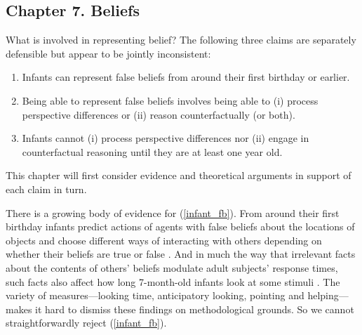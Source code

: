 \documentclass[12pt,\papersize]{extarticle}
\begin{document}
%
%
%


\subsection{Chapter 7. Beliefs}
What is involved in representing belief?
The following three claims are separately defensible but appear to be jointly inconsistent: 
%
\begin{enumerate}
\item Infants can represent false beliefs from around their first birthday or earlier. \label{infant_fb}
%
\item  \label{fb_is_perspectives}  Being able to represent false beliefs involves being able to  (i) process perspective differences or (ii) reason counterfactually (or both).
%
\item Infants cannot (i) process perspective differences nor (ii) engage in counterfactual reasoning until they are at least one year old.  \label{infant_perspectives}
%
\end{enumerate}
%
This chapter will first consider evidence and theoretical arguments in support of each claim in turn.  

There is a growing body of evidence for (\ref{infant_fb}).
From around their first birthday infants  predict actions of agents with false beliefs about the locations of objects \citep[]{Onishi:2005hm, Southgate:2007js}
and choose different ways of interacting with others depending on whether their beliefs are true or false \citep[]{Buttelmann:2009gy,Knudsen:2011fk,southgate:2010fb}.  
And in much the way that irrelevant facts about the contents of others’ beliefs modulate adult subjects’ response times, such facts also affect how long 7-month-old infants look at some stimuli \citep[]{kovacs_social_2010}.
The variety of  measures---looking time, anticipatory looking, pointing and helping---makes it hard to dismiss these findings on methodological grounds.
So we cannot straightforwardly reject (\ref{infant_fb}).
\end{document}
